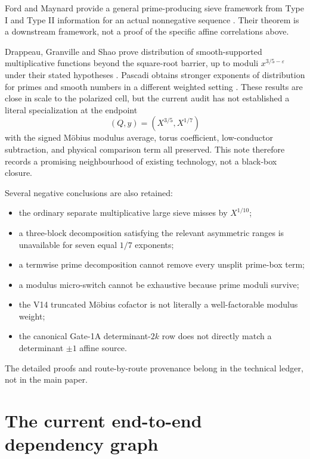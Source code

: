 \documentclass[11pt]{article}
\theoremstyle{definition}
\newcommand{\1}{\mathbf 1}
\begin{document}
Ford and Maynard provide a general prime-producing sieve framework from Type I and Type II
information for an actual nonnegative sequence \cite{FordMaynard2024}.  Their theorem is a
downstream framework, not a proof of the specific affine correlations above.

Drappeau, Granville and Shao prove distribution of smooth-supported multiplicative
functions beyond the square-root barrier, up to moduli $x^{3/5-\varepsilon}$ under their
stated hypotheses \cite{DGS2017}.  Pascadi obtains stronger exponents of distribution for
primes and smooth numbers in a different weighted setting \cite{Pascadi2025}.  These
results are close in scale to the polarized cell, but the current audit has not established
a literal specialization at the endpoint
\[
(Q,y)=(X^{3/5},X^{1/7})
\]
with the signed M\"obius modulus average, torus coefficient, low-conductor subtraction, and
physical comparison term all preserved.  This note therefore records a promising
neighbourhood of existing technology, not a black-box closure.

Several negative conclusions are also retained:
\begin{itemize}[leftmargin=1.6em]
\item the ordinary separate multiplicative large sieve misses by $X^{1/10}$;
\item a three-block decomposition satisfying the relevant asymmetric ranges is unavailable
for seven equal $1/7$ exponents;
\item a termwise prime decomposition cannot remove every unsplit prime-box term;
\item a modulus micro-switch cannot be exhaustive because prime moduli survive;
\item the V14 truncated M\"obius cofactor is not literally a well-factorable modulus weight;
\item the canonical Gate-1A determinant-$2k$ row does not directly match a determinant
$\pm1$ affine source.
\end{itemize}
The detailed proofs and route-by-route provenance belong in the technical ledger, not in
the main paper.

\section{The current end-to-end dependency graph}
\end{document}
